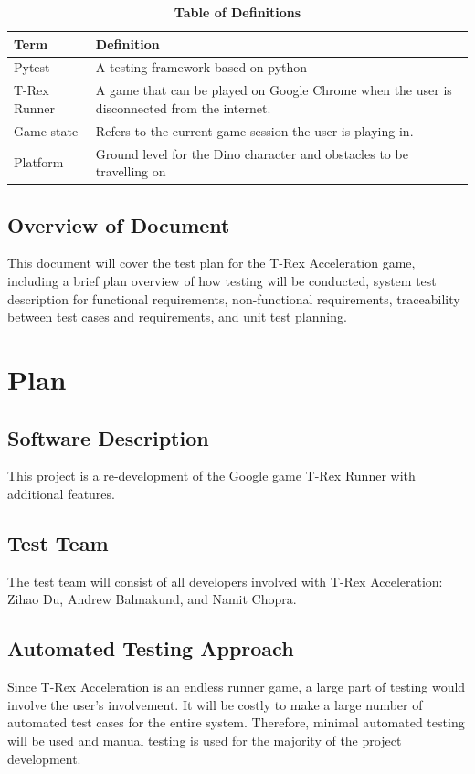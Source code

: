 \documentclass[12pt, titlepage]{article}
\begin{document}
\begin{table}[!htbp]
\caption{\textbf{Table of Definitions}} \label{Table}

\begin{tabularx}{\textwidth}{p{3cm}X}
\toprule
\textbf{Term} & \textbf{Definition}\\
\midrule
Pytest & A testing framework based on python\\
T-Rex Runner & A game that can be played on Google Chrome when the user is disconnected from the internet.\\
Game state & Refers to the current game session the user is playing in.\\
Platform & Ground level for the Dino character and obstacles to be travelling on\\
\bottomrule
\end{tabularx}

\end{table}	

\subsection{Overview of Document}
This document will cover the test plan for the T-Rex Acceleration game, including a brief plan overview of how testing will be conducted, system test description for functional requirements, non-functional requirements, traceability between test cases and requirements, and unit test planning.

\section{Plan}
	
\subsection{Software Description}
This project is a re-development of the Google game T-Rex Runner with additional features.

\subsection{Test Team}
The test team will consist of all developers involved with T-Rex Acceleration: Zihao Du, Andrew Balmakund, and Namit Chopra.

\subsection{Automated Testing Approach}
Since T-Rex Acceleration is an endless runner game, a large part of testing would involve the user's involvement. It will be costly to make a large number of automated test cases for the entire system. Therefore, minimal automated testing will be used and manual testing is used for the majority of the project development.
\end{document}
